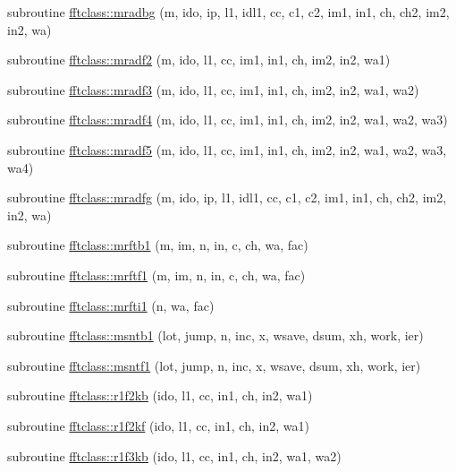 \begin{DoxyCompactItemize}
\item 
subroutine \mbox{\hyperlink{namespacefftclass_ae156d4969bbcc9250a0dc81ee91d3cdf}{fftclass\+::mradbg}} (m, ido, ip, l1, idl1, cc, c1, c2, im1, in1, ch, ch2, im2, in2, wa)
\item 
subroutine \mbox{\hyperlink{namespacefftclass_a577b893eadc27ccc53b888490cb1b873}{fftclass\+::mradf2}} (m, ido, l1, cc, im1, in1, ch, im2, in2, wa1)
\item 
subroutine \mbox{\hyperlink{namespacefftclass_a4e99b7194e96b9a086f743a98205cc5a}{fftclass\+::mradf3}} (m, ido, l1, cc, im1, in1, ch, im2, in2, wa1, wa2)
\item 
subroutine \mbox{\hyperlink{namespacefftclass_aec86b95620b11b4db180468a4f771842}{fftclass\+::mradf4}} (m, ido, l1, cc, im1, in1, ch, im2, in2, wa1, wa2, wa3)
\item 
subroutine \mbox{\hyperlink{namespacefftclass_ab6d74e30932fcf82744ac339de050933}{fftclass\+::mradf5}} (m, ido, l1, cc, im1, in1, ch, im2, in2, wa1, wa2, wa3, wa4)
\item 
subroutine \mbox{\hyperlink{namespacefftclass_a5741ec7db9519828a0c46df4355b734d}{fftclass\+::mradfg}} (m, ido, ip, l1, idl1, cc, c1, c2, im1, in1, ch, ch2, im2, in2, wa)
\item 
subroutine \mbox{\hyperlink{namespacefftclass_a025f68a6ddd573ad3fa337835b621d3c}{fftclass\+::mrftb1}} (m, im, n, in, c, ch, wa, fac)
\item 
subroutine \mbox{\hyperlink{namespacefftclass_a5b17cd46c9d021ed6dfe9499fc802b3f}{fftclass\+::mrftf1}} (m, im, n, in, c, ch, wa, fac)
\item 
subroutine \mbox{\hyperlink{namespacefftclass_a88a3f7fd420d15d4e4d603d4d8ebf38e}{fftclass\+::mrfti1}} (n, wa, fac)
\item 
subroutine \mbox{\hyperlink{namespacefftclass_aebd25014fd97baa3be31bda9b446e99f}{fftclass\+::msntb1}} (lot, jump, n, inc, x, wsave, dsum, xh, work, ier)
\item 
subroutine \mbox{\hyperlink{namespacefftclass_a151bd1685dbe69c9c36a08ff00a7e10e}{fftclass\+::msntf1}} (lot, jump, n, inc, x, wsave, dsum, xh, work, ier)
\item 
subroutine \mbox{\hyperlink{namespacefftclass_a6cf75b3c3c340adb4eb40e50289cf439}{fftclass\+::r1f2kb}} (ido, l1, cc, in1, ch, in2, wa1)
\item 
subroutine \mbox{\hyperlink{namespacefftclass_a9d3bdd521a616fe934704cb38ac074f4}{fftclass\+::r1f2kf}} (ido, l1, cc, in1, ch, in2, wa1)
\item 
subroutine \mbox{\hyperlink{namespacefftclass_ad450dc5bf08d49d4784e609c41b42950}{fftclass\+::r1f3kb}} (ido, l1, cc, in1, ch, in2, wa1, wa2)

\end{DoxyCompactItemize}
